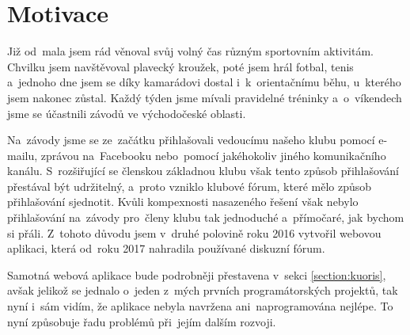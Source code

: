 \section{Motivace}\label{section:motivation}
Již od~mala jsem rád věnoval svůj volný čas různým sportovním aktivitám. Chvilku jsem navštěvoval plavecký kroužek, poté jsem hrál fotbal, tenis a~jednoho dne jsem se díky kamarádovi dostal i~k~orientačnímu běhu, u~kterého jsem nakonec zůstal. Každý týden jsme mívali pravidelné tréninky a~o~víkendech jsme se účastnili závodů ve východočeské oblasti.

Na~závody jsme se ze~začátku přihlašovali vedoucímu našeho klubu pomocí e-mailu, zprávou na~Facebooku nebo~pomocí jakéhokoliv jiného komunikačního kanálu. S~rozšiřující se členskou základnou klubu však tento způsob přihlašování přestával být udržitelný, a~proto vzniklo klubové fórum, které mělo způsob přihlašování sjednotit. Kvůli kompexnosti nasazeného řešení však nebylo přihlašování na~závody pro~členy klubu tak jednoduché a~přímočaré, jak bychom si přáli. Z~tohoto důvodu jsem v~druhé polovině roku 2016 vytvořil webovou aplikaci, která od~roku 2017 nahradila používané diskuzní fórum.

Samotná webová aplikace bude podrobněji přestavena v~sekci \ref{section:kuoris}, avšak jelikož se jednalo o~jeden z~mých prvních programátorských projektů, tak nyní i~sám vidím, že aplikace nebyla navržena ani~naprogramována nejlépe. To nyní způsobuje řadu problémů při~jejím dalším rozvoji.
